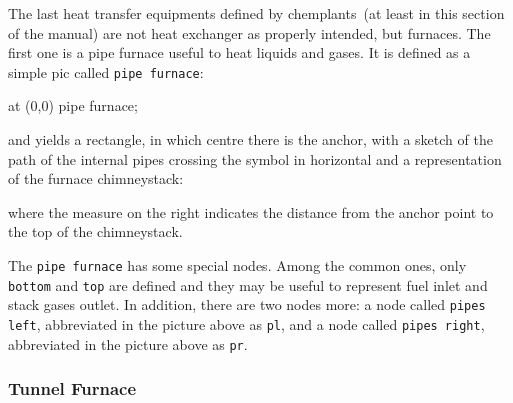 \documentclass[12pt]{article}						%
\newcommand*{\chpn}[1]{\texttt{#1}}				%
\newcommand*{\chpp}[1]{\texttt{#1}}				%
\newcommand*{\chemplants}{chemplants}
\begin{document}
The last heat transfer equipments defined by \chemplants\ (at least in this
section of the manual) are not heat exchanger as properly intended, but furnaces.
The first one is a pipe furnace useful to heat liquids and gases. It is defined
as a simple pic called \chpp{pipe furnace}:
\begin{chpcode}
	\pic at (0,0) {pipe furnace};
\end{chpcode}
and yields a rectangle, in which centre there is the anchor, with a sketch of
the path of the internal pipes crossing the symbol in horizontal and a
representation of the furnace chimneystack:
\begin{center}
\end{center}
where the measure on the right indicates the distance from the anchor point to
the top of the chimneystack.

The \chpp{pipe furnace} has some special nodes. Among the common ones, only
\chpn{bottom} and \chpn{top} are defined and they may be useful to represent
fuel inlet and stack gases outlet. In addition, there are two nodes more: a node
called \chpn{pipes left}, abbreviated in the picture above as \chpn{pl}, and a
node called \chpn{pipes right}, abbreviated in the picture above as \chpn{pr}.

\subsubsection{Tunnel Furnace}
\end{document}

